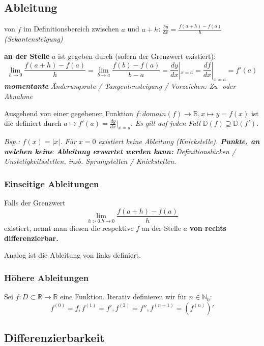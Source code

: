 \subsection{Ableitung}

 von $f$ im Definitionsbereich zwischen $a$ und $a+h$: $\frac{\delta y}{\delta x} = \frac{f(a+h) - f(a)}{h}$ 
\textit{(Sekantensteigung)}

 \textbf{an der Stelle} $a$ ist gegeben durch (sofern der Grenzwert existiert):
$$\lim_{h \rightarrow 0}\frac{f(a+h) - f(a)}{h} = \lim_{b \rightarrow a}\frac{f(b)-f(a)}{b-a} = \frac{dy}{dx}|_{x=a}=\frac{df}{dx}|_{x=a}=f'(a)$$
\textit{\textbf{momentante} Änderungsrate / Tangentensteigung / Vorzeichen: Zu- oder Abnahme}

Ausgehend von einer gegebenen Funktion $f: domain(f) \rightarrow \mathbb{R}, x \mapsto y = f(x)$ ist die  definiert durch $a \mapsto f'(a) = \frac{dy}{dx}|_{x=a}$.
\textit{Es gilt auf jeden Fall $\mathbb{D}(f) \supseteq \mathbb{D}(f')$.}

\textit{Bsp.: $f(x)=|x|$. Für $x=0$ existiert keine Ableitung (Knickstelle). \textbf{Punkte, an welchen keine Ableitung erwartet werden kann:} Definitionslücken / Unstetigkeitsstellen, insb. Sprungstellen / Knickstellen.}

\subsubsection{Einseitige Ableitungen}

Falls der Grenzwert 
$$\lim_{h>0\; h \rightarrow 0}\frac{f(a+h)-f(a)}{h}$$
existiert, nennt man diesen die  respektive $f$ an der Stelle $a$ \textbf{von rechts differenzierbar.}

Analog ist die Ableitung von links definiert.

\subsubsection{Höhere Ableitungen}

Sei $f : D \subset \mathbb{R} \rightarrow \mathbb{R}$ eine Funktion. Iterativ definieren wir  für $n \in \mathbb{N}_0$:
$$f^{(0)}=f, f^{(1)} = f', f^{(2)}=f'', f^{(n+1)}=(f^{(n)})'$$

\subsection{Differenzierbarkeit}

